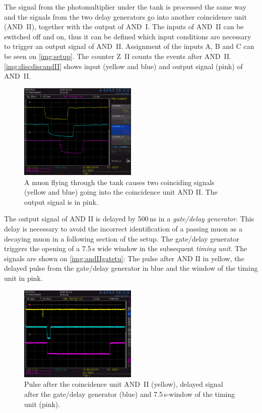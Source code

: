 The signal from the photomultiplier under the tank is processed the same way and
the signals from the two delay generators go into another coincidence unit (AND~II),
together with the output of AND~I. The inputs of AND~II can be switched off and on,
thus it can be defined which input conditions are necessary to trigger an output signal of AND~II.
Assignment of the inputs A, B and C can be seen on \autoref{img:setup}.
The counter Z~II counts the events after AND~II.
\autoref{img:discdiscandII} shows input (yellow and blue) and output signal (pink) of AND~II.


\begin{figure}[H]
\begin{center}
  \includegraphics[width=0.5\textwidth]{../img/S0007.PNG}
  \caption{A muon flying through the tank causes two coinciding signals (yellow and blue) going
  into the coincidence unit AND II. The output signal is in pink.}
  \label{img:discdiscandII}
\end{center}
\end{figure}

The output signal of AND II is delayed by 500\,ns in a \emph{gate/delay generator}.
This delay is necessary to avoid the incorrect identification of a passing muon as a decaying muon
in a following section of the setup.
The gate/delay generator triggers the opening of a 7.5\,\textmu s wide window in the subsequent
\emph{timing unit}.
The signals are shown on \autoref{img:andIIgatetu}: The pulse after AND II in yellow,
the delayed pulse from the gate/delay generator in blue and the window of the timing unit in pink.

\begin{figure}[H]
\begin{center}
  \includegraphics[width=0.5\textwidth]{../img/S0009.PNG}
  \caption{Pulse after the coincidence unit AND~II (yellow), delayed signal after the gate/delay generator (blue)
  and 7.5\,\textmu s-window of the timing unit (pink).}
  \label{img:andIIgatetu}
\end{center}
\end{figure}

